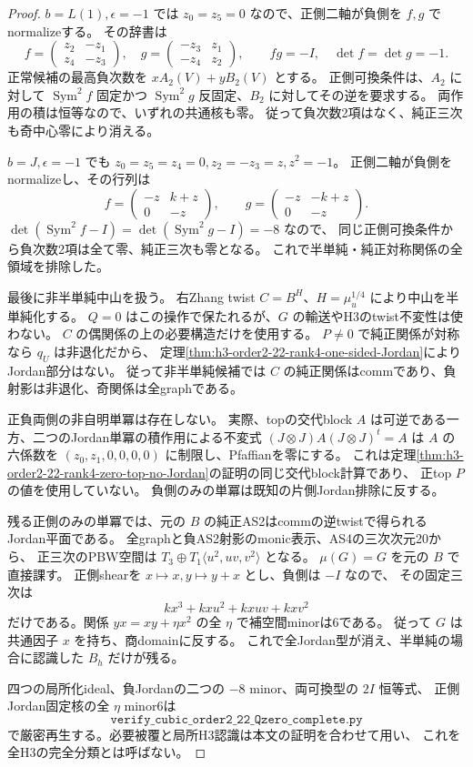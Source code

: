 \begin{proof}
$b=L(1),\epsilon=-1$ では $z_0=z_5=0$ なので、正側二軸が負側を $f,g$ でnormalizeする。
その辞書は
\[
 f=\begin{pmatrix}z_2&-z_1\\z_4&-z_3\end{pmatrix},\quad
 g=\begin{pmatrix}-z_3&z_1\\-z_4&z_2\end{pmatrix},\qquad
 fg=-I,\quad \det f=\det g=-1.
\]
正常候補の最高負次数を $xA_2(V)+yB_2(V)$ とする。
正側可換条件は、$A_2$ に対して $\operatorname{Sym}^2f$ 固定かつ
$\operatorname{Sym}^2g$ 反固定、$B_2$ に対してその逆を要求する。
両作用の積は恒等なので、いずれの共通核も零。
従って負次数2項はなく、純正三次も奇中心零により消える。

$b=J,\epsilon=-1$ でも $z_0=z_5=z_4=0,z_2=-z_3=z,z^2=-1$。
正側二軸が負側をnormalizeし、その行列は
\[
 f=\begin{pmatrix}-z&k+z\\0&-z\end{pmatrix},\qquad
 g=\begin{pmatrix}-z&-k+z\\0&-z\end{pmatrix}.
\]
$\det(\operatorname{Sym}^2 f-I)=\det(\operatorname{Sym}^2 g-I)=-8$ なので、
同じ正側可換条件から負次数2項は全て零、純正三次も零となる。
これで半単純・純正対称関係の全領域を排除した。

最後に非半単純中山を扱う。
右Zhang twist $C=B^{H}$、$H=\mu_u^{1/4}$ により中山を半単純化する。
$Q=0$ はこの操作で保たれるが、$G$ の輸送やH3のtwist不変性は使わない。
$C$ の偶関係の上の必要構造だけを使用する。
$P\ne0$ で純正関係が対称なら $q_U$ は非退化だから、
定理\ref{thm:h3-order2-22-rank4-one-sided-Jordan}によりJordan部分はない。
従って非半単純候補では $C$ の純正関係はcommであり、負射影は非退化、奇関係は全graphである。

正負両側の非自明単冪は存在しない。
実際、topの交代block $A$ は可逆である一方、二つのJordan単冪の積作用による不変式
$(J\otimes J)A(J\otimes J)^t=A$ は
$A$ の六係数を $(z_0,z_1,0,0,0,0)$ に制限し、Pfaffianを零にする。
これは定理\ref{thm:h3-order2-22-rank4-zero-top-no-Jordan}の証明の同じ交代block計算であり、
正top $P$ の値を使用していない。
負側のみの単冪は既知の片側Jordan排除に反する。

残る正側のみの単冪では、元の $B$ の純正AS2はcommの逆twistで得られるJordan平面である。
全graphと負AS2射影のmonic表示、AS4の三次次元20から、
正三次のPBW空間は $T_3\oplus T_1\langle u^2,uv,v^2\rangle$ となる。
$\mu(G)=G$ を元の $B$ で直接課す。
正側shearを $x\mapsto x,y\mapsto y+x$ とし、負側は $-I$ なので、
その固定三次は
\[
 kx^3+kxu^2+kxuv+kxv^2
\]
だけである。関係 $yx=xy+\eta x^2$ の全 $\eta$ で補空間minorは6である。
従って $G$ は共通因子 $x$ を持ち、商domainに反する。
これで全Jordan型が消え、半単純の場合に認識した $B_h$ だけが残る。

四つの局所化ideal、負Jordanの二つの $-8$ minor、両可換型の $2I$ 恒等式、
正側Jordan固定核の全 $\eta$ minor6は
\[
\texttt{verify\_cubic\_order2\_22\_Qzero\_complete.py}
\]
で厳密再生する。必要被覆と局所H3認識は本文の証明を合わせて用い、
これを全H3の完全分類とは呼ばない。
\end{proof}
